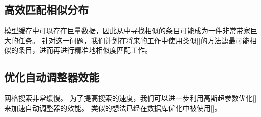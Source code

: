 \subsection{高效匹配相似分布}
模型缓存中可以存在巨量数据，因此从中寻找相似的条目可能成为一件非常带家巨大的任务。
针对这一问题，我们计划在将来的工作中使用类似[]的方法滤最可能相似的条目，进而再进行精准地相似度匹配工作。


\subsection{优化自动调整器效能}
网格搜索非常缓慢。
为了提高搜索的速度，我们可以进一步利用高斯超参数优化[]来加速自动调整器的效能。
类似的想法已经在数据库优化中被使用[]。

